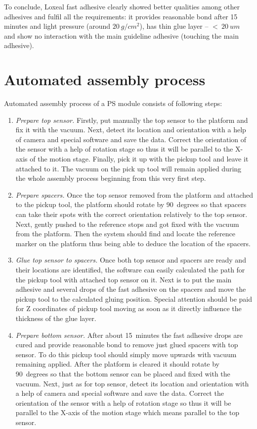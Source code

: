 To conclude, Loxeal fast adhesive clearly showed better qualities among other adhesives and fulfil all the requirements: it provides reasonable bond after 15 minutes and light pressure (around $20~g/cm^{2}$), has thin glue layer -- $<~20~um$ and show no interaction with the main guideline adhesive (touching the main adhesive).

\section{Automated assembly process}

Automated assembly process of a PS module consists of following steps:

\begin{enumerate}
\setlength\itemsep{-0.5em}
\item \emph{Prepare top sensor.} Firstly, put manually the top sensor to the platform and fix it with the vacuum. Next, detect its location and orientation with a help of camera and special software and save the data. Correct the orientation of the sensor with a help of rotation stage so thus it will be parallel to the X-axis of the motion stage. Finally, pick it up with the pickup tool and leave it attached to it. The vacuum on the pick up tool will remain applied during the whole assembly process beginning from this very first step.
\item \emph{Prepare spacers.} Once the top sensor removed from the platform and attached to the pickup tool, the platform should rotate by 90~degrees so that spacers can take their spots with the correct orientation relatively to the top sensor. Next, gently pushed to the reference stops and got fixed with the vacuum from the platform. Then the system should find and locate the reference marker on the platform thus being able to deduce the location of the spacers.
\item \emph{Glue top sensor to spacers.} Once both top sensor and spacers are ready and their locations are identified, the software can easily calculated the path for the pickup tool with attached top sensor on it. Next is to put the main adhesive and several drops of the fast adhesive on the spacers and move the pickup tool to the calculated gluing position. Special attention should be paid for Z coordinates of pickup tool moving as soon as it directly influence the thickness of the glue layer.
\item \emph{Prepare bottom sensor.} After about 15~minutes the fast adhesive drops are cured and provide reasonable bond to remove just glued spacers with top sensor. To do this pickup tool should simply move upwards with vacuum remaining applied. After the platform is cleared it should rotate by 90~degrees so that the bottom sensor can be placed and fixed with the vacuum. Next, just as for top sensor, detect its location and orientation with a help of camera and special software and save the data. Correct the orientation of the sensor with a help of rotation stage so thus it will be parallel to the X-axis of the motion stage which means parallel to the top sensor.

\end{enumerate}
